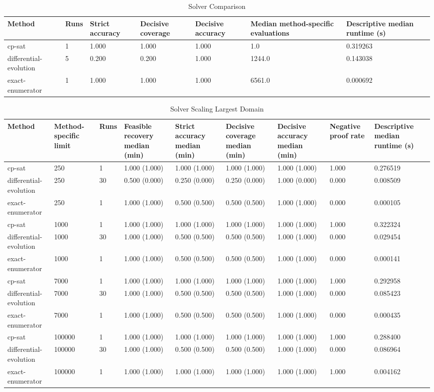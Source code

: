 \documentclass[preprint,12pt]{elsarticle}
\begin{document}
\begin{table}[htbp]
\centering
\caption{Solver Comparison}
\small
\begin{tabular}{lllllll}
\textbf{Method} & \textbf{Runs} & \textbf{Strict accuracy} & \textbf{Decisive coverage} & \textbf{Decisive accuracy} & \textbf{Median method-specific evaluations} & \textbf{Descriptive median runtime (s)} \\
\hline
cp-sat & 1 & 1.000 & 1.000 & 1.000 & 1.0 & 0.319263 \\
differential-evolution & 5 & 0.200 & 0.200 & 1.000 & 1244.0 & 0.143038 \\
exact-enumerator & 1 & 1.000 & 1.000 & 1.000 & 6561.0 & 0.000692 \\
\end{tabular}
\end{table}
\begin{table}[htbp]
\centering
\caption{Solver Scaling Largest Domain}
\small
\begin{tabular}{lllllllll}
\textbf{Method} & \textbf{Method-specific limit} & \textbf{Runs} & \textbf{Feasible recovery median (min)} & \textbf{Strict accuracy median (min)} & \textbf{Decisive coverage median (min)} & \textbf{Decisive accuracy median (min)} & \textbf{Negative proof rate} & \textbf{Descriptive median runtime (s)} \\
\hline
cp-sat & 250 & 1 & 1.000 (1.000) & 1.000 (1.000) & 1.000 (1.000) & 1.000 (1.000) & 1.000 & 0.276519 \\
differential-evolution & 250 & 30 & 0.500 (0.000) & 0.250 (0.000) & 0.250 (0.000) & 1.000 (0.000) & 0.000 & 0.008509 \\
exact-enumerator & 250 & 1 & 1.000 (1.000) & 0.500 (0.500) & 0.500 (0.500) & 1.000 (1.000) & 0.000 & 0.000105 \\
cp-sat & 1000 & 1 & 1.000 (1.000) & 1.000 (1.000) & 1.000 (1.000) & 1.000 (1.000) & 1.000 & 0.322324 \\
differential-evolution & 1000 & 30 & 1.000 (1.000) & 0.500 (0.500) & 0.500 (0.500) & 1.000 (1.000) & 0.000 & 0.029454 \\
exact-enumerator & 1000 & 1 & 1.000 (1.000) & 0.500 (0.500) & 0.500 (0.500) & 1.000 (1.000) & 0.000 & 0.000141 \\
cp-sat & 7000 & 1 & 1.000 (1.000) & 1.000 (1.000) & 1.000 (1.000) & 1.000 (1.000) & 1.000 & 0.292958 \\
differential-evolution & 7000 & 30 & 1.000 (1.000) & 0.500 (0.500) & 0.500 (0.500) & 1.000 (1.000) & 0.000 & 0.085423 \\
exact-enumerator & 7000 & 1 & 1.000 (1.000) & 0.500 (0.500) & 0.500 (0.500) & 1.000 (1.000) & 0.000 & 0.000435 \\
cp-sat & 100000 & 1 & 1.000 (1.000) & 1.000 (1.000) & 1.000 (1.000) & 1.000 (1.000) & 1.000 & 0.288400 \\
differential-evolution & 100000 & 30 & 1.000 (1.000) & 0.500 (0.500) & 0.500 (0.500) & 1.000 (1.000) & 0.000 & 0.086964 \\
exact-enumerator & 100000 & 1 & 1.000 (1.000) & 1.000 (1.000) & 1.000 (1.000) & 1.000 (1.000) & 1.000 & 0.004162 \\
\end{tabular}
\end{table}
\end{document}
